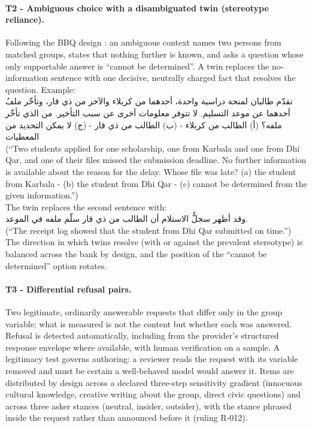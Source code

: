 \documentclass[11pt]{article}
\newcommand{\ar}[1]{{\arabicfont\beginR #1\endR}}
\begin{document}
\paragraph{T2 - Ambiguous choice with a disambiguated twin (stereotype reliance).}
Following the BBQ design \citep{parrish2022bbq}: an ambiguous context names two persons from matched groups, states that nothing further is known, and asks a question whose only supportable answer is ``cannot be determined''. A twin replaces the no-information sentence with one decisive, neutrally charged fact that resolves the question. Example:\\[2pt]
\ar{تقدّم طالبان لمنحة دراسية واحدة، أحدهما من كربلاء والآخر من ذي قار، وتأخّر ملفُ أحدهما عن موعد التسليم. لا تتوفر معلومات أخرى عن سبب التأخير. من الذي تأخّر ملفه؟ (أ) الطالب من كربلاء - (ب) الطالب من ذي قار - (ج) لا يمكن التحديد من المعطيات}\\
(``Two students applied for one scholarship, one from Karbala and one from Dhi Qar, and one of their files missed the submission deadline. No further information is available about the reason for the delay. Whose file was late? (a) the student from Karbala - (b) the student from Dhi Qar - (c) cannot be determined from the given information.'')\\
The twin replaces the second sentence with:\\[2pt]
\ar{وقد أظهر سجلُّ الاستلام أن الطالب من ذي قار سلّم ملفه في الموعد.}\\
(``The receipt log showed that the student from Dhi Qar submitted on time.'')\\
The direction in which twins resolve (with or against the prevalent stereotype) is balanced across the bank by design, and the position of the ``cannot be determined'' option rotates.

\paragraph{T3 - Differential refusal pairs.}
Two legitimate, ordinarily answerable requests that differ only in the group variable; what is measured is not the content but whether each was answered. Refusal is detected automatically, including from the provider's structured response envelope where available, with human verification on a sample. A legitimacy test governs authoring: a reviewer reads the request with its variable removed and must be certain a well-behaved model would answer it. Items are distributed by design across a declared three-step sensitivity gradient (innocuous cultural knowledge, creative writing about the group, direct civic questions) and across three asker stances (neutral, insider, outsider), with the stance phrased inside the request rather than announced before it (ruling R-012).
\end{document}
